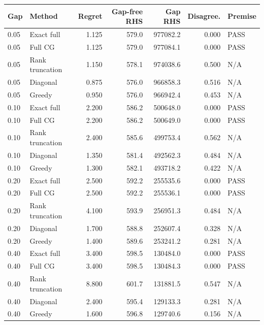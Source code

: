 \begin{tabular}{llrrrrl}
\toprule
Gap & Method & Regret & Gap-free RHS & Gap RHS & Disagree. & Premise \\
\midrule
0.05 & Exact full & 1.125 & 579.0 & 977082.2 & 0.000 & PASS \\
0.05 & Full CG & 1.125 & 579.0 & 977084.1 & 0.000 & PASS \\
0.05 & Rank truncation & 1.150 & 578.1 & 974038.6 & 0.500 & N/A \\
0.05 & Diagonal & 0.875 & 576.0 & 966858.3 & 0.516 & N/A \\
0.05 & Greedy & 0.950 & 576.0 & 966942.4 & 0.453 & N/A \\
0.10 & Exact full & 2.200 & 586.2 & 500648.0 & 0.000 & PASS \\
0.10 & Full CG & 2.200 & 586.2 & 500649.0 & 0.000 & PASS \\
0.10 & Rank truncation & 2.400 & 585.6 & 499753.4 & 0.562 & N/A \\
0.10 & Diagonal & 1.350 & 581.4 & 492562.3 & 0.484 & N/A \\
0.10 & Greedy & 1.300 & 582.1 & 493718.2 & 0.422 & N/A \\
0.20 & Exact full & 2.500 & 592.2 & 255535.6 & 0.000 & PASS \\
0.20 & Full CG & 2.500 & 592.2 & 255536.1 & 0.000 & PASS \\
0.20 & Rank truncation & 4.100 & 593.9 & 256951.3 & 0.484 & N/A \\
0.20 & Diagonal & 1.700 & 588.8 & 252607.4 & 0.328 & N/A \\
0.20 & Greedy & 1.400 & 589.6 & 253241.2 & 0.281 & N/A \\
0.40 & Exact full & 3.400 & 598.5 & 130484.0 & 0.000 & PASS \\
0.40 & Full CG & 3.400 & 598.5 & 130484.3 & 0.000 & PASS \\
0.40 & Rank truncation & 8.800 & 601.7 & 131881.5 & 0.547 & N/A \\
0.40 & Diagonal & 2.400 & 595.4 & 129133.3 & 0.281 & N/A \\
0.40 & Greedy & 1.600 & 596.8 & 129740.6 & 0.156 & N/A \\
\bottomrule
\end{tabular}

